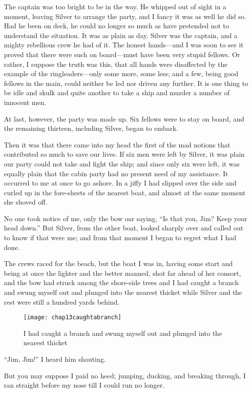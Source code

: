 The captain was too bright to be in the way. He whipped out of sight in a moment, leaving Silver to arrange the party, and I fancy it was as well he did so. Had he been on deck, he could no longer so much as have pretended not to understand the situation. It was as plain as day. Silver was the captain, and a mighty rebellious crew he had of it. The honest hands---and I was soon to see it proved that there were such on board---must have been very stupid fellows. Or rather, I suppose the truth was this, that all hands were disaffected by the example of the ringleaders---only some more, some less; and a few, being good fellows in the main, could neither be led nor driven any further. It is one thing to be idle and skulk and quite another to take a ship and murder a number of innocent men.

At last, however, the party was made up. Six fellows were to stay on board, and the remaining thirteen, including Silver, began to embark.

Then it was that there came into my head the first of the mad notions that contributed so much to save our lives. If six men were left by Silver, it was plain our party could not take and fight the ship; and since only six were left, it was equally plain that the cabin party had no present need of my assistance. It occurred to me at once to go ashore. In a jiffy I had slipped over the side and curled up in the fore-sheets of the nearest boat, and almost at the same moment she shoved off.

No one took notice of me, only the bow oar saying, \enquote{Is that you, Jim? Keep your head down.} But Silver, from the other boat, looked sharply over and called out to know if that were me; and from that moment I began to regret what I had done.

 

The crews raced for the beach, but the boat I was in, having some start and being at once the lighter and the better manned, shot far ahead of her consort, and the bow had struck among the shore-side trees and I had caught a branch and swung myself out and plunged into the nearest thicket while Silver and the rest were still a hundred yards behind.

 \begin{sidewaysfigure}
\texttt{[image: chap13caughtabranch]}%
\caption[Caught a branch and swung myself out]{I had caught a branch and swung myself out and plunged into the nearest thicket}
\end{sidewaysfigure} 

\enquote{Jim, Jim!} I heard him shouting.

But you may suppose I paid no heed; jumping, ducking, and breaking through, I ran straight before my nose till I could run no longer.
\enlargethispage{\baselineskip}